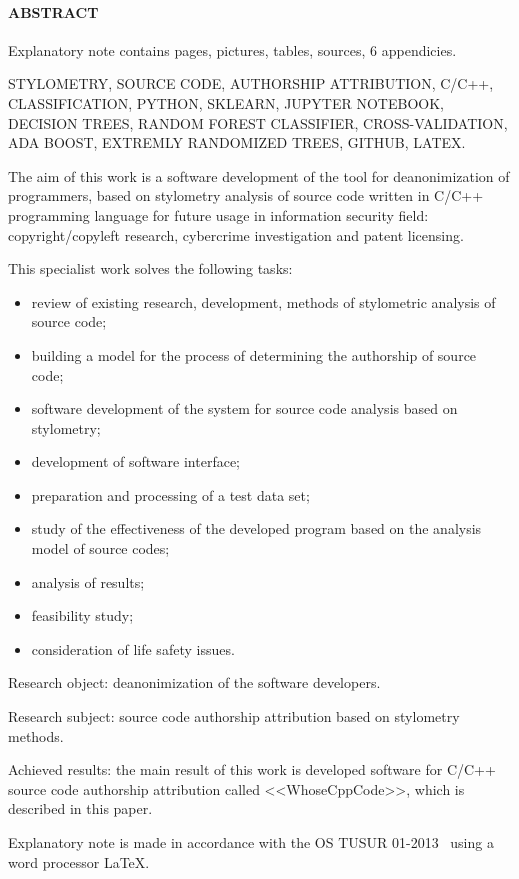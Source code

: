 \newpage
{}
\paragraph{\hfill ABSTRACT \hfill}
Explanatory note contains  pages,  pictures,  tables,
 sources, 6 appendicies.

STYLOMETRY, SOURCE CODE, AUTHORSHIP ATTRIBUTION, C/C++, CLASSIFICATION, PYTHON, SKLEARN,
JUPYTER NOTEBOOK, DECISION TREES, RANDOM FOREST CLASSIFIER, CROSS-VALIDATION, 
ADA BOOST, EXTREMLY RANDOMIZED TREES, GITHUB, LATEX.

The aim of this work is a software development of the tool for deanonimization of programmers, 
based on stylometry analysis of source code written in C/C++ programming language for future
usage in information security field: copyright/copyleft research, cybercrime investigation and patent licensing.

This specialist work solves the following tasks:
\begin{itemize}
  \item review of existing research, development, methods of stylometric analysis of source code;
  \item building a model for the process of determining the authorship of source code;
  \item software development of the system for source code analysis based on stylometry;
  \item development of software interface;
  \item preparation and processing of a test data set;
  \item study of the effectiveness of the developed program based on the analysis model of source codes;
  \item analysis of results;
  \item feasibility study;
  \item consideration of life safety issues.
\end{itemize}

Research object: deanonimization of the software developers.

Research subject: source code authorship attribution based on stylometry methods.

Achieved results: the main result of this work is developed software for C/C++ source code 
authorship attribution called <<WhoseCppCode>>, which is described in this paper.

Explanatory note is made in accordance with the OS TUSUR 01-2013~\cite{ostusur} using a word processor \LaTeX.
